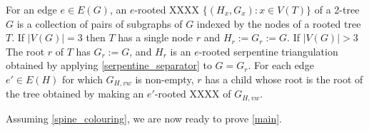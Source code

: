\documentclass[kpfonts]{patmorin}
\DeclareMathOperator{\pw}{pw}
\begin{document}
%
%

For an edge $e\in E(G)$, an $e$-rooted XXXX $\{(H_x,G_x):x\in V(T)\}$ of a 2-tree $G$ is a collection of pairs of subgraphs of $G$ indexed by the nodes of a rooted tree $T$.  If $|V(G)|=3$ then $T$ has a single node $r$ and $H_r:=G_r:=G$.  If $|V(G)|>3$ The root $r$ of $T$ has $G_r:=G$, and $H_r$ is an $e$-rooted serpentine triangulation obtained by applying \cref{serpentine_separator} to $G=G_r$.  For each edge $e'\in E(H)$ for which $G_{H,vw}$ is non-empty, $r$ has a child whose root is the root of the tree obtained by making an $e'$-rooted XXXX of $G_{H,vw}$.

Assuming \cref{spine_colouring}, we are now ready to prove \cref{main}.
\end{document}
